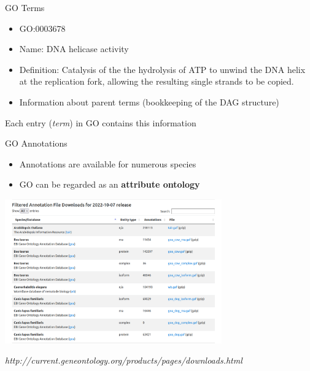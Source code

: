 \documentclass{beamer}
\begin{document}
\begin{frame}{GO Terms}
\begin{itemize}
\item GO:0003678
\item Name: DNA helicase activity
\item Def{}inition: Catalysis of the the hydrolysis of ATP to unwind the DNA helix at the 
replication fork, allowing the resulting single strands to be copied.
\item Information about parent terms (bookkeeping of the DAG structure)
\end{itemize} 
\begin{small}Each entry (\textit{term}) in GO contains this information\end{small}
\end{frame}


\begin{frame}{GO Annotations}
\begin{itemize}
\item Annotations are available for numerous species
\item GO can be regarded as an {\bf attribute ontology}
\end{itemize}
\begin{center}
\includegraphics[width=0.7\textwidth]{img/go-gaf-page.png}
\end{center}
\begin{flushleft}
\begin{tiny}\textit{http://current.geneontology.org/products/pages/downloads.html}\end{tiny}
\end{flushleft}
\end{frame}

\end{document}
